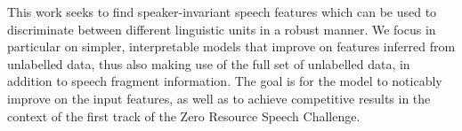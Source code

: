 This work seeks to find speaker-invariant speech features which can be used to discriminate between different linguistic units in a robust manner.
We focus in particular on simpler, interpretable models that improve on features inferred from unlabelled data, thus also making use of the full set of unlabelled data, in addition to speech fragment information.
The goal is for the model to noticably improve on the input features, as well as to achieve competitive results in the context of the first track of the Zero Resource Speech Challenge.

